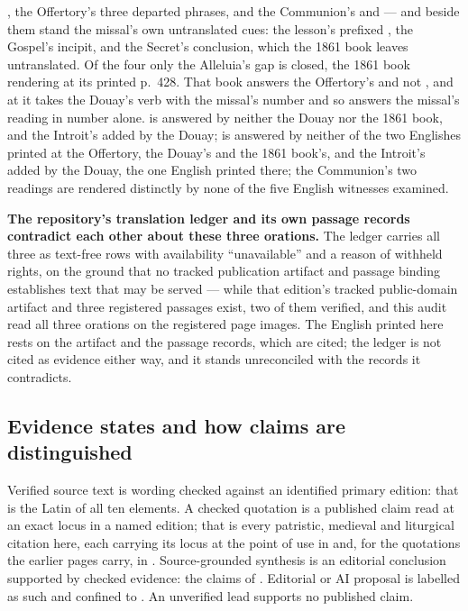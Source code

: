 , the Offertory's three departed phrases, and the
Communion's  and  --- and beside them stand the
missal's own untranslated cues: the lesson's prefixed , the
Gospel's incipit, and the Secret's conclusion, which the 1861 book leaves
untranslated. Of the four only the Alleluia's gap is closed, the 1861 book
rendering  at its printed p.~428. That book answers
the Offertory's  and not , and at  it takes the Douay's verb with the missal's number
and so answers the missal's reading in number alone. \ifdefined\TriptychSynthesisEdition
{} is answered by neither the Douay nor the 1861 book, and
the Introit's added  by the Douay;%
\else
{} is
answered by neither of the two Englishes printed at the Offertory, the Douay's
and the 1861 book's, and the Introit's added  by the Douay, the one
English printed there;%
\fi{} the Communion's two readings are rendered distinctly by
none of the five English witnesses examined.

\textbf{The repository's translation ledger and its own passage records
contradict each other about these three orations.} The ledger carries all three
as text-free rows with availability ``unavailable'' and a reason of
withheld rights, on the ground that no tracked publication artifact and passage
binding establishes text that may be served --- while that edition's tracked
public-domain artifact and three registered passages exist, two of them verified,
and this audit read all three orations on the registered page images. The English
printed here rests on the artifact and the passage records, which are cited; the
ledger is not cited as evidence either way, and it stands unreconciled with the
records it contradicts.

\subsection*{Evidence states and how claims are distinguished}

Verified source text is wording checked against an identified primary edition:
that is the Latin of all ten elements. A checked quotation is a published claim
read at an exact locus in a named edition; that is every patristic, medieval and
liturgical citation here, each carrying its locus at the point of use in
 and, for the quotations the earlier
pages carry, in . Source-grounded synthesis is an
editorial conclusion supported by checked evidence: the claims of
. Editorial or AI proposal is
labelled as such and confined to .
An unverified lead supports no published claim.


